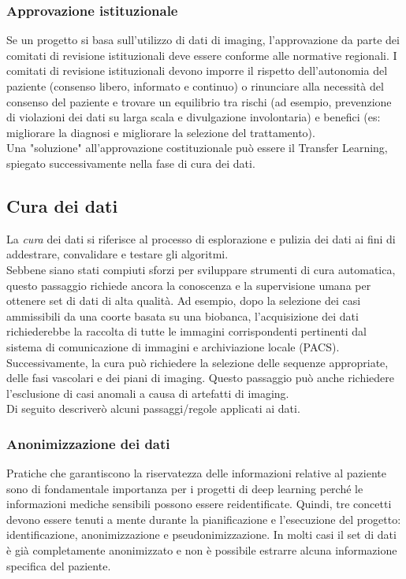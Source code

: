 \documentclass[12pt,a4paper]{report}
\begin{document}
\subsubsection{Approvazione istituzionale}
Se un progetto si basa sull’utilizzo di dati di imaging, l'approvazione da parte dei comitati di revisione istituzionali deve essere conforme alle normative regionali. I comitati di revisione istituzionali devono imporre il rispetto dell'autonomia del paziente (consenso libero, informato e continuo) o rinunciare alla necessità del consenso del paziente e trovare un equilibrio tra rischi (ad esempio, prevenzione di violazioni dei dati su larga scala e divulgazione involontaria) e benefici (es: migliorare la diagnosi e migliorare la selezione del trattamento).\\
Una "soluzione" all'approvazione costituzionale può essere il Transfer Learning, spiegato successivamente nella fase di cura dei dati.

\subsection{Cura dei dati}
La \emph{cura} dei dati si riferisce al processo di esplorazione e pulizia dei dati ai fini di addestrare, convalidare e testare gli algoritmi. \\
Sebbene siano stati compiuti sforzi per sviluppare strumenti di cura automatica, questo passaggio richiede ancora la conoscenza e la supervisione umana per ottenere set di dati di alta qualità.
Ad esempio, dopo la selezione dei casi ammissibili da una coorte basata su una biobanca, l'acquisizione dei dati richiederebbe la raccolta di tutte le immagini corrispondenti pertinenti dal sistema di comunicazione di immagini e archiviazione locale (PACS). Successivamente, la cura può richiedere la selezione delle sequenze appropriate, delle fasi vascolari e dei piani di imaging. Questo passaggio può anche richiedere l'esclusione di casi anomali a causa di artefatti di imaging.\\
Di seguito descriverò alcuni passaggi/regole applicati ai dati.

\subsubsection{Anonimizzazione dei dati}
Pratiche che garantiscono la riservatezza delle informazioni relative al paziente sono di fondamentale importanza per i progetti di deep learning perché le informazioni mediche sensibili possono essere reidentificate. Quindi, tre concetti devono essere tenuti a mente durante la pianificazione e l'esecuzione del progetto: identificazione, anonimizzazione e pseudonimizzazione.
In molti casi il set di dati è già completamente anonimizzato e non è possibile estrarre alcuna informazione specifica del paziente. 
\end{document}
